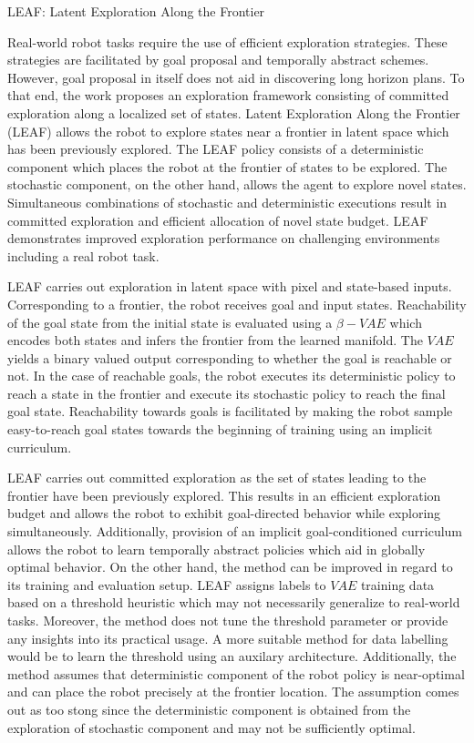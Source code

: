 \documentclass[11pt,letterpaper]{article}
\begin{document}
\begin{center}
  \large{LEAF: Latent Exploration Along the Frontier}
\end{center}
Real-world robot tasks require the use of efficient exploration strategies. These strategies are facilitated by goal proposal and temporally abstract schemes. However, goal proposal in itself does not aid in discovering long horizon plans. To that end, the work proposes an exploration framework consisting of committed exploration along a localized set of states. Latent Exploration Along the Frontier (LEAF) allows the robot to explore states near a frontier in latent space which has been previously explored. The LEAF policy consists of a deterministic component which places the robot at the frontier of states to be explored. The stochastic component, on the other hand, allows the agent to explore novel states. Simultaneous combinations of stochastic and deterministic executions result in committed exploration and efficient allocation of novel state budget. LEAF demonstrates improved exploration performance on challenging environments including a real robot task. 

LEAF carries out exploration in latent space with pixel and state-based inputs. Corresponding to a frontier, the robot receives goal and input states. Reachability of the goal state from the initial state is evaluated using a $\beta-VAE$ which encodes both states and infers the frontier from the learned manifold. The $VAE$ yields a binary valued output corresponding to whether the goal is reachable or not. In the case of reachable goals, the robot executes its deterministic policy to reach a state in the frontier and execute its stochastic policy to reach the final goal state. Reachability towards goals is facilitated by making the robot sample easy-to-reach goal states towards the beginning of training using an implicit curriculum.

LEAF carries out committed exploration as the set of states leading to the frontier have been previously explored. This results in an efficient exploration budget and allows the robot to exhibit goal-directed behavior while exploring simultaneously. Additionally, provision of an implicit goal-conditioned curriculum allows the robot to learn temporally abstract policies which aid in globally optimal behavior. On the other hand, the method can be improved in regard to its training and evaluation setup. LEAF assigns labels to $VAE$ training data based on a threshold heuristic which may not necessarily generalize to real-world tasks. Moreover, the method does not tune the threshold parameter or provide any insights into its practical usage. A more suitable method for data labelling would be to learn the threshold using an auxilary architecture. Additionally, the method assumes that deterministic component of the robot policy is near-optimal and can place the robot precisely at the frontier location. The assumption comes out as too stong since the deterministic component is obtained from the exploration of stochastic component and may not be sufficiently optimal. 
\end{document}
